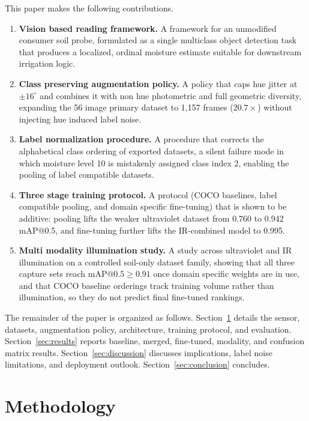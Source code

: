 ﻿\documentclass[journal]{IEEEtran}
\begin{document}
This paper makes the following contributions.
\begin{enumerate}
\item \textbf{Vision based reading framework.} A framework for an unmodified consumer soil probe, formulated as a single multiclass object detection task that produces a localized, ordinal moisture estimate suitable for downstream irrigation logic.
\item \textbf{Class preserving augmentation policy.} A policy that caps hue jitter at $\pm 16^{\circ}$ and combines it with non hue photometric and full geometric diversity, expanding the 56 image primary dataset to 1{,}157 frames ($20.7\times$) without injecting hue induced label noise.
\item \textbf{Label normalization procedure.} A procedure that corrects the alphabetical class ordering of exported datasets, a silent failure mode in which moisture level 10 is mistakenly assigned class index 2, enabling the pooling of label compatible datasets.
\item \textbf{Three stage training protocol.} A protocol (COCO baselines, label compatible pooling, and domain specific fine-tuning) that is shown to be additive: pooling lifts the weaker ultraviolet dataset from 0.760 to 0.942 mAP@0.5, and fine-tuning further lifts the IR-combined model to 0.995.
\item \textbf{Multi modality illumination study.} A study across ultraviolet and IR illumination on a controlled soil-only dataset family, showing that all three capture sets reach $\text{mAP@0.5} \geq 0.91$ once domain specific weights are in use, and that COCO baseline orderings track training volume rather than illumination, so they do not predict final fine-tuned rankings.
\end{enumerate}

The remainder of the paper is organized as follows. Section~\ref{sec:method} details the sensor, datasets, augmentation policy, architecture, training protocol, and evaluation. Section~\ref{sec:results} reports baseline, merged, fine-tuned, modality, and confusion matrix results. Section~\ref{sec:discussion} discusses implications, label noise limitations, and deployment outlook. Section~\ref{sec:conclusion} concludes.

\section{Methodology}
\label{sec:method}
\end{document}
